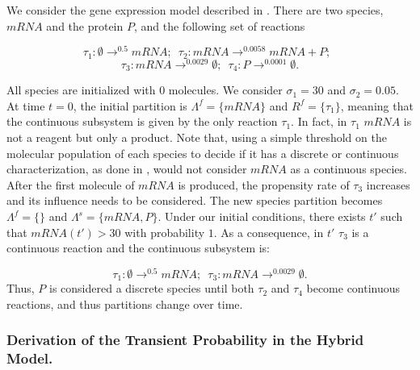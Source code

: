 \documentclass{llncs}
\begin{document}
\begin{example}\label{Gene Expression}
We consider the gene expression model described in \cite{thattai2001}.
There are two species, $mRNA$ and the protein $P$, and the following set of reactions

\[ \tau_1:\emptyset \rightarrow^{0.5} mRNA; \, \, \,
\tau_2: mRNA \rightarrow^{0.0058} mRNA + P;\,\,\,\]
\[
\tau_3: mRNA \rightarrow^{0.0029} \emptyset ; \,\,\,
\tau_4: P \rightarrow^{0.0001} \emptyset .  \]

All species are initialized with $0$ molecules.
We consider $\sigma_1=30$ and $\sigma_2=0.05$. At time $t=0$, the initial partition is $\Lambda^f=\{ mRNA\}$ and $R^f=\{ \tau_1\}$, meaning that the continuous subsystem %
is given by the only reaction $\tau_1$.
In fact, in $\tau_1$ $mRNA$ is not a reagent but only a product. Note that, using a simple threshold on the molecular population of each species to decide if it has a discrete or continuous characterization, as done in \cite{henzinger2010hybrid}, would not consider $mRNA$ as a continuous species.
After the first molecule of $mRNA$ is produced, the propensity rate of $\tau_3$ increases and its influence %
needs to be considered. The new species partition becomes $\Lambda^f=\{\}$ and $\Lambda^s=\{ mRNA,P \}$. Under our initial conditions, there exists $t'$ such that $mRNA(t')>30$ with probability $1$. As a consequence, in $t'$ $\tau_3$ is a continuous reaction and the continuous subsystem is:

\[    \tau_1:\emptyset \rightarrow^{0.5} mRNA; \, \, \,
\tau_3: mRNA \rightarrow^{0.0029} \emptyset .    \]
Thus, $P$ is considered a discrete species until both $\tau_2$ and $\tau_4$ become continuous reactions, and thus partitions change over time. %
\end{example}

\subsubsection{Derivation of the Transient Probability in the Hybrid Model.}\label{NewCMEs}
\end{document}
